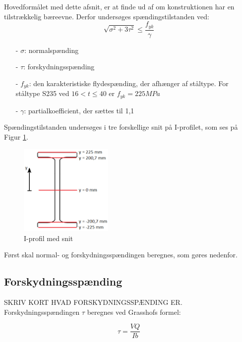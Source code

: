 Hovedformålet med dette afsnit, er at finde ud af om konstruktionen har en tilstrækkelig bæreevne. Derfor undersøges spændingstilstanden ved: 
\begin{equation}
	\sqrt{\sigma^2 + 3\tau^2} \le \frac{f_{yk}}{\gamma}
\end{equation}

\begin{itemize}
	\item[-] $\sigma$: normalspænding 
	\item[-] $\tau$: forskydningsspænding
	\item[-] $f_{yk}$: den karakteristiske flydespænding, der afhænger af ståltype. For ståltype S235 ved $16 < t \le 40$ er $f_{yk} = 225 MPa$ \citep[ s. 213]{stabi}
	\item[-] $\gamma$: partialkoefficient, der sættes til 1,1 \citep[ s. 212]{stabi}
\end{itemize}

Spændingstilstanden undersøges i tre forskellige snit på I-profilet, som ses på Figur \ref{fig:iprofilsnit}.

\begin{figure}[H]
	\centering
	\includegraphics[width=0.4\textwidth]{billeder/iprofilsnit.png}
	\caption{I-profil med snit}
	\label{fig:iprofilsnit}
\end{figure}

Først skal normal- og forskydningsspændingen beregnes, som gøres nedenfor. 

\subsection{Forskydningsspænding}
SKRIV KORT HVAD FORSKYDNINGSSPÆNDING ER.
\newline
Forskydningsspændingen $\tau$ beregnes ved Grasshofs formel:

\begin{equation}
\tau = \frac{VQ}{Ib}
\end{equation}

